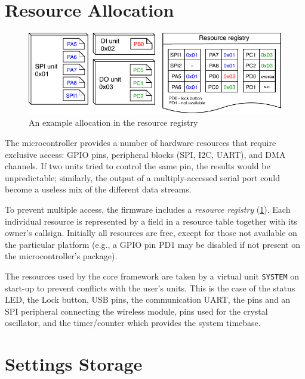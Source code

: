 \section{Resource Allocation} \label{sec:res_allocation}

\begin{figure}[h]
	\centering
	\includegraphics[scale=1] {img/resource-repository.pdf}
	\caption{\label{fig:resource_repository}An example allocation in the resource registry}
\end{figure}

The microcontroller provides a number of hardware resources that require exclusive access: GPIO pins, peripheral blocks (\gls{SPI}, \gls{I2C}, \gls{UART}\textellipsis), and \gls{DMA} channels. If two units tried to control the same pin, the results would be unpredictable; similarly, the output of a multiply-accessed serial port could become a useless mix of the different data streams.

To prevent multiple access, the firmware includes a \textit{resource registry} (\cref{fig:resource_repository}). Each individual resource is represented by a field in a resource table together with its owner's callsign. Initially all resources are free, except for those not available on the particular platform (e.g., a \gls{GPIO} pin PD1 may be disabled if not present on the microcontroller's package).

The resources used by the core framework are taken by a virtual unit \verb|SYSTEM| on start-up to prevent conflicts with the user's units. This is the case of the status \gls{LED}, the Lock button, \gls{USB} pins, the communication \gls{UART}, the pins and an \gls{SPI} peripheral connecting the wireless module, pins used for the crystal oscillator, and the timer/counter which provides the system timebase.


\section{Settings Storage} \label{sec:settings_storage}

